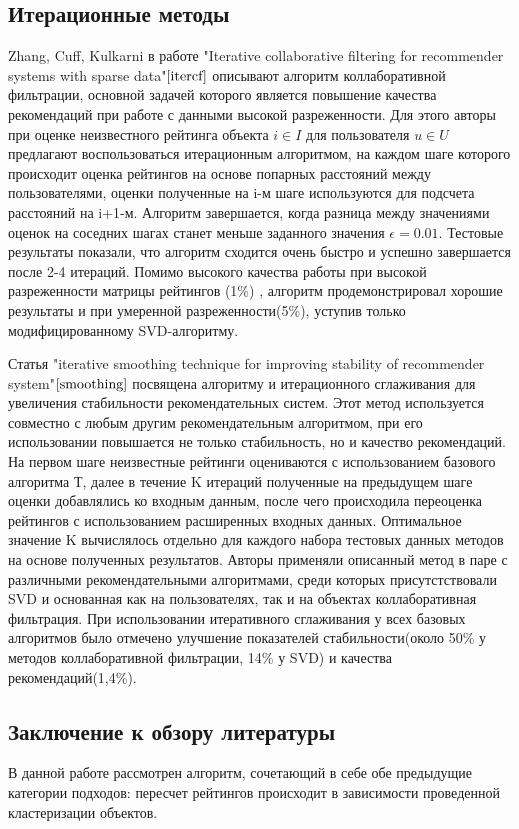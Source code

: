 \documentclass[12pt]{article} %
\begin{document}
\subsection{Итерационные методы}
\par
Zhang, Cuff, Kulkarni в работе "Iterative collaborative filtering for recommender systems with sparse data"$\cite{itercf}$ описывают алгоритм коллаборативной фильтрации, основной задачей которого является повышение качества рекомендаций при работе с данными высокой разреженности. Для этого авторы при оценке неизвестного рейтинга объекта $i \in I$ для пользователя $u \in U$ предлагают воспользоваться итерационным алгоритмом, на каждом шаге которого происходит оценка рейтингов на основе попарных расстояний между пользователями, оценки полученные на i-м шаге используются для подсчета расстояний на i+1-м. Алгоритм завершается, когда разница между значениями оценок на соседних шагах станет меньше заданного значения $\epsilon=0.01$. Тестовые результаты показали, что алгоритм сходится очень быстро и успешно завершается после 2-4 итераций. Помимо высокого качества работы при высокой разреженности матрицы рейтингов (1\%) , алгоритм продемонстрировал хорошие результаты и при умеренной разреженности(5\%), уступив только модифицированному SVD-алгоритму.

\par
Статья "iterative smoothing technique for improving stability of recommender system"$\cite{smoothing}$ посвящена алгоритму и итерационного сглаживания для увеличения стабильности рекомендательных систем. Этот метод используется совместно с любым другим рекомендательным алгоритмом, при его использовании повышается не только стабильность, но и качество рекомендаций. На первом шаге неизвестные рейтинги оцениваются с использованием базового алгоритма Т, далее в течение K итераций полученные на предыдущем шаге оценки добавлялись ко входным данным, после чего происходила переоценка рейтингов с использованием расширенных входных данных. Оптимальное значение K вычислялось отдельно для каждого набора тестовых данных методов на основе полученных результатов. Авторы применяли описанный метод в паре с различными рекомендательными алгоритмами, среди которых присутстствовали SVD и основанная как на пользователях, так и на объектах коллаборативная фильтрация. При использовании итеративного сглаживания у всех базовых алгоритмов было отмечено улучшение показателей стабильности(около 50\% у методов коллаборативной фильтрации, 14\% у SVD) и качества рекомендаций(1,4\%). 

\subsection{Заключение к обзору литературы}
В данной работе рассмотрен алгоритм, сочетающий в себе обе предыдущие категории подходов: пересчет рейтингов происходит в зависимости проведенной кластеризации объектов.
\end{document}

